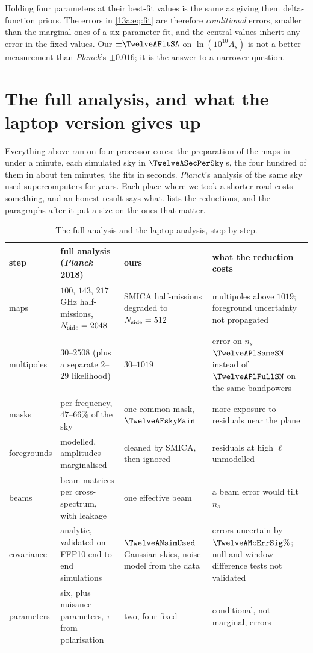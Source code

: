 \begin{pitfall}
Holding four parameters at their best-fit values is the same as giving them delta-function priors. The errors in \eqref{13a:eq:fit}
are therefore \emph{conditional} errors, smaller than the marginal ones of a six-parameter fit, and the central values inherit any
error in the fixed values. Our $\pm\TwelveAFitSA$ on $\ln(10^{10}A_s)$ is not a better measurement than \textit{Planck}'s $\pm0.016$; it is the
answer to a narrower question.
\end{pitfall}
\section{The full analysis, and what the laptop version gives up}
\label{13a:sec:research}

Everything above ran on four processor cores: the preparation of the maps in under a minute, each simulated sky in
$\TwelveASecPerSky$\,s, the four hundred of them in about ten minutes, the fits in seconds. \textit{Planck}'s analysis of the
same sky used supercomputers for years. Each place where we took a shorter road costs something, and an honest result says
what.  lists the reductions, and the paragraphs after it put a size on the ones that matter.

\begin{table}[htbp]
\centering\small
\begin{tabularx}{\linewidth}{@{}>{\raggedright}p{2.3cm}>{\raggedright}X>{\raggedright}X>{\raggedright\arraybackslash}X@{}}
\toprule
step & full analysis (\textit{Planck} 2018) & ours & what the reduction costs\\
\midrule
maps & $100$, $143$, $217$\,GHz half-missions, $N_{\rm side}=2048$ & SMICA half-missions degraded to $N_{\rm side}=512$ & multipoles above $1019$; foreground uncertainty not propagated\\
multipoles & $30$--$2508$ (plus a separate $2$--$29$ likelihood) & $30$--$1019$ & error on $n_s$ $\TwelveAPlSameSN$ instead of $\TwelveAPlFullSN$ on the same bandpowers\\
masks & per frequency, $47$--$66\%$ of the sky & one common mask, $\TwelveAFskyMain$ & more exposure to residuals near the plane\\
foregrounds & modelled, amplitudes marginalised & cleaned by SMICA, then ignored & residuals at high $\ell$ unmodelled\\
beams & beam matrices per cross-spectrum, with leakage & one effective beam & a beam error would tilt $n_s$\\
covariance & analytic, validated on FFP10 end-to-end simulations & $\TwelveANsimUsed$ Gaussian skies, noise model from the data & errors uncertain by $\TwelveAMcErrSig\%$; null and window-difference tests not validated\\
parameters & six, plus nuisance parameters, $\tau$ from polarisation & two, four fixed & conditional, not marginal, errors\\
\bottomrule
\end{tabularx}
\caption{The full analysis and the laptop analysis, step by step.}
\label{13a:tab:nerf}
\end{table}

